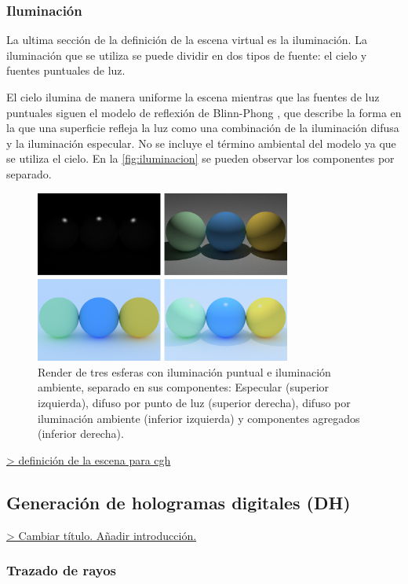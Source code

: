 \documentclass[10pt, a4paper]{article}
\begin{document}
\subsubsection{Iluminación}

La ultima sección de la definición de la escena virtual es la iluminación. La iluminación que se utiliza se puede dividir en dos tipos de fuente: el cielo y fuentes puntuales de luz.

El cielo ilumina de manera uniforme la escena mientras que las fuentes de luz puntuales siguen el modelo de reflexión de Blinn-Phong \cite{Blinn:1977}, que describe la forma en la que una superficie refleja la luz como una combinación de la iluminación difusa y la iluminación especular. No se incluye el término ambiental del modelo ya que se utiliza el cielo. En la \autoref{fig:iluminacion} se pueden observar los componentes por separado.

\begin{figure}[H]
    \centering 
    \includegraphics[width=0.75\textwidth]{05_agg}
    \caption{Render de tres esferas con iluminación puntual e iluminación ambiente, separado en sus componentes: Especular (superior izquierda), difuso por punto de luz (superior derecha), difuso por iluminación ambiente (inferior izquierda) y componentes agregados (inferior derecha).}
    \label{fig:iluminacion}
\end{figure}

\underline{> definición de la escena para cgh}

\subsection{Generación de hologramas digitales (DH)}

\underline{> Cambiar título. Añadir introducción.}

\subsubsection{Trazado de rayos}
\end{document}
